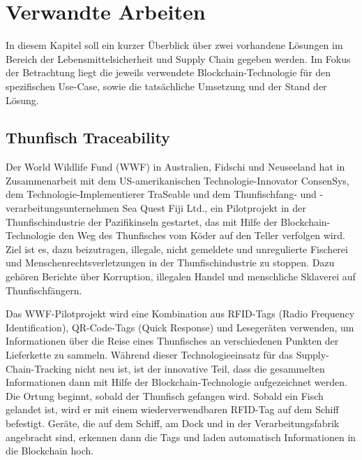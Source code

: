 \section{Verwandte Arbeiten} \label{sec:related-work}
In diesem Kapitel soll ein kurzer Überblick über zwei vorhandene Lösungen im Bereich der Lebensmittelsicherheit und Supply Chain gegeben werden. Im Fokus der Betrachtung liegt die jeweils verwendete Blockchain-Technologie für den spezifischen Use-Case, sowie die tatsächliche Umsetzung und der Stand der Lösung.

\subsection{Thunfisch Traceability}
Der World Wildlife Fund (WWF) in Australien, Fidschi und Neuseeland hat in Zusammenarbeit mit dem US-amerikanischen Technologie-Innovator ConsenSys, dem Technologie-Implementierer TraSeable und dem Thunfischfang- und -verarbeitungs\-unternehmen Sea Quest Fiji Ltd., ein Pilotprojekt in der Thunfischindustrie der Pazifikinseln gestartet, das mit Hilfe der Blockchain-Technologie den Weg des Thunfisches vom \glqq Köder auf den Teller\grqq{} verfolgen wird. Ziel ist es, dazu beizutragen, illegale, nicht gemeldete und unregulierte Fischerei und Menschenrechtsverletzungen in der Thunfischindustrie zu stoppen. Dazu gehören Berichte über Korruption, illegalen Handel und menschliche Sklaverei auf Thunfischfängern.

Das WWF-Pilotprojekt wird eine Kombination aus RFID-Tags (Radio Frequency Identification), QR-Code-Tags (Quick Response) und Lesegeräten verwenden, um Informationen über die Reise eines Thunfisches an verschiedenen Punkten der Lieferkette zu sammeln. Während dieser Technologieeinsatz für das Supply-Chain-Tracking nicht neu ist, ist der innovative Teil, dass die gesammelten Informationen dann mit Hilfe der Blockchain-Technologie aufgezeichnet werden. Die Ortung beginnt, sobald der Thunfisch gefangen wird. Sobald ein Fisch gelandet ist, wird er mit einem wiederverwendbaren RFID-Tag auf dem Schiff befestigt. Geräte, die auf dem Schiff, am Dock und in der Verarbeitungsfabrik angebracht sind, erkennen dann die Tags und laden automatisch Informationen in die Blockchain hoch. 

